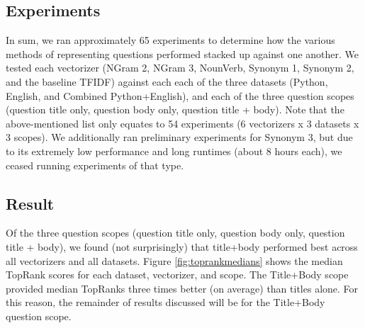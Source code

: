 \documentclass{acm_proc_article-sp}
\begin{document}
\subsection{Experiments}
In sum, we ran approximately 65 experiments to determine how the various methods of representing questions performed stacked up against one another. We tested each vectorizer (NGram 2, NGram 3, NounVerb, Synonym 1, Synonym 2, and the baseline TFIDF) against each each of the three datasets (Python, English, and Combined Python+English), and each of the three question scopes (question title only, question body only, question title + body). 
Note that the above-mentioned list only equates to 54 experiments (6 vectorizers x 3 datasets x 3 scopes). We additionally ran preliminary experiments for Synonym 3, but due to its extremely low performance and long runtimes (about 8 hours each), we ceased running experiments of that type.

\subsection{Result}
Of the three question scopes (question title only, question body only, question title + body), we found (not surprisingly) that title+body performed best across all vectorizers and all datasets. Figure \ref{fig:toprankmedians} shows the median TopRank scores for each dataset, vectorizer, and scope. The Title+Body scope provided median TopRanks three times better (on average) than titles alone. For this reason, the remainder of results discussed will be for the Title+Body question scope.
\end{document}
